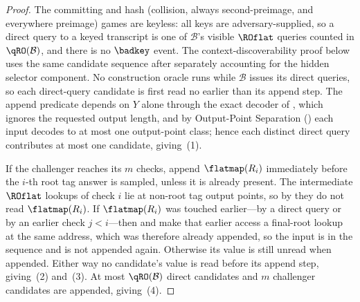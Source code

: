 \begin{proof}
The committing and hash (collision, always second-preimage, and everywhere
preimage) games are keyless: all keys are adversary-supplied, so a direct
query to a keyed transcript is one of
$\mathcal{B}$'s visible $\ROflat$ queries counted in $\qRO(\mathcal{B})$,
and there is no $\badkey$ event. The context-discoverability proof below
uses the same candidate sequence after separately accounting for the
hidden selector component. No construction oracle runs while
$\mathcal{B}$ issues its direct queries, so each direct-query candidate is
first read no earlier than its append step. The append predicate depends
on $Y$ alone through the exact decoder of , which
ignores the requested output length, and by Output-Point Separation
() each input decodes to at most one output-point
class; hence each distinct direct query contributes at most one
candidate, giving~(1).

If the challenger reaches its $m$ checks, append $\flatmap(R_i)$
immediately before the $i$-th root tag answer is sampled, unless it is
already present. The intermediate $\ROflat$ lookups of check $i$ lie at
non-root tag output points, so by  they do not read
$\flatmap(R_i)$. If $\flatmap(R_i)$ was touched earlier---by a direct
query or by an earlier check $j < i$---then  and
 make that earlier access a final-root lookup at the
same address, which was therefore already appended, so the input is in
the sequence and is not appended again. Otherwise its value is still
unread when appended. Either way no candidate's value is read before its
append step, giving~(2) and~(3). At most $\qRO(\mathcal{B})$ direct
candidates and $m$ challenger candidates are appended, giving~(4).
\end{proof}

